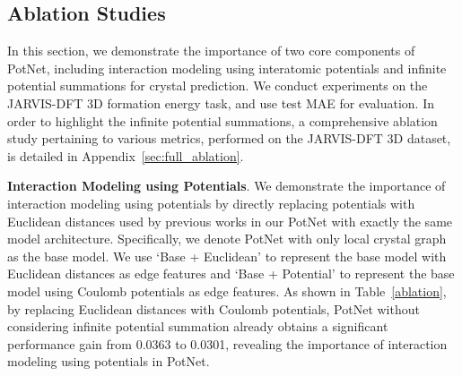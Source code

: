 \documentclass[nohyperref]{article}
\theoremstyle{plain}
\theoremstyle{definition}
\theoremstyle{remark}
\begin{document}
\begin{table}[t]
\caption{Prediction time cost of infinite potential summation algorithm on the JARVIS test dataset with 5572 crystals. The prediction time considers both preprocessing and model inference time.}
\begin{center}
\vspace{-0.4cm}

\label{table:algorithm_cost}
\end{center}
\vspace{-0.8cm}
\end{table} 


\subsection{Ablation Studies}

In this section, we demonstrate the importance of two core components of PotNet, including interaction modeling using interatomic potentials and infinite potential summations for crystal prediction. We conduct experiments on the JARVIS-DFT 3D formation energy task, and use test MAE for evaluation. In order to highlight the infinite potential summations, a comprehensive ablation study pertaining to various metrics, performed on the JARVIS-DFT 3D dataset, is detailed in Appendix~\ref{sec:full_ablation}.

\textbf{Interaction Modeling using Potentials}. We demonstrate the importance of interaction modeling using potentials by directly replacing potentials with Euclidean distances used by previous works in our PotNet with exactly the same model architecture. Specifically, we denote PotNet with only local crystal graph as the base model. We use `Base + Euclidean' to represent the base model with Euclidean distances as edge features and `Base + Potential' to represent the base model using Coulomb potentials as edge features. As shown in Table~\ref{ablation}, by replacing Euclidean distances with Coulomb potentials, PotNet without considering infinite potential summation already obtains a significant performance gain from 0.0363 to 0.0301, revealing the importance of interaction modeling using potentials in PotNet.
\end{document}
